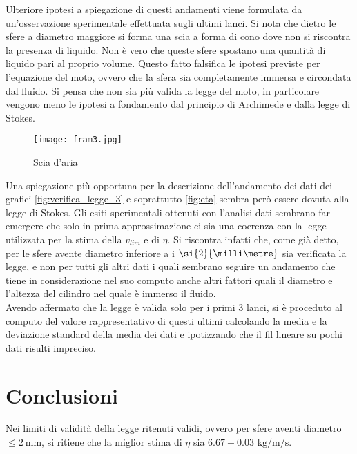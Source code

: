 \documentclass[a4paper,11pt,oneside]{article}
\begin{document}
Ulteriore ipotesi a spiegazione di questi andamenti viene formulata da un'osservazione sperimentale effettuata sugli ultimi lanci. Si nota che dietro le sfere a diametro maggiore si forma una scia a forma di cono dove non si riscontra la presenza di liquido. Non è vero che queste sfere spostano una quantità di liquido pari al proprio volume. Questo fatto falsifica le ipotesi previste per l'equazione del moto, ovvero che la sfera sia completamente immersa e circondata dal fluido. Si pensa che non sia più valida la legge del moto, in particolare vengono meno le ipotesi a fondamento dal principio di Archimede e dalla legge di Stokes.\\

 \begin{wrapfigure}{l}{3.5cm}
    \centering
    \vspace{0.5cm}
    \texttt{[image: fram3.jpg]}
    \caption{Scia d'aria}
    \label{fig:scia_aria}
\end{wrapfigure}

Una spiegazione più opportuna per la descrizione dell'andamento dei dati dei grafici \ref{fig:verifica_legge_3} e soprattutto \ref{fig:eta} sembra però essere dovuta alla legge di Stokes.
Gli esiti sperimentali ottenuti con l'analisi dati sembrano far emergere che
solo in prima approssimazione ci sia una coerenza con la legge utilizzata per la stima della $v_{lim}$ e di $\eta$.  Si riscontra infatti che, come già detto, per le sfere avente diametro inferiore a i $\si{2}{\milli\metre}$ sia verificata la legge, e non per tutti gli altri dati i quali sembrano seguire un andamento che tiene in considerazione nel suo computo anche altri fattori quali il diametro e l'altezza del cilindro nel quale è immerso il fluido. \\

Avendo affermato che la legge è valida solo per i primi 3 lanci, si è proceduto al computo del valore rappresentativo di questi ultimi calcolando la media e la deviazione standard della media dei dati e ipotizzando che il fil lineare su pochi dati risulti impreciso.



\section{Conclusioni}
Nei limiti di validità della legge ritenuti validi, ovvero per sfere aventi diametro $\leq \SI{2}{\milli\meter}$,  si ritiene che la miglior stima di $\eta$ sia $6.67 \pm 0.03$  $\si{\kilo\gram\per\metre\per\second}$.
\end{document}
